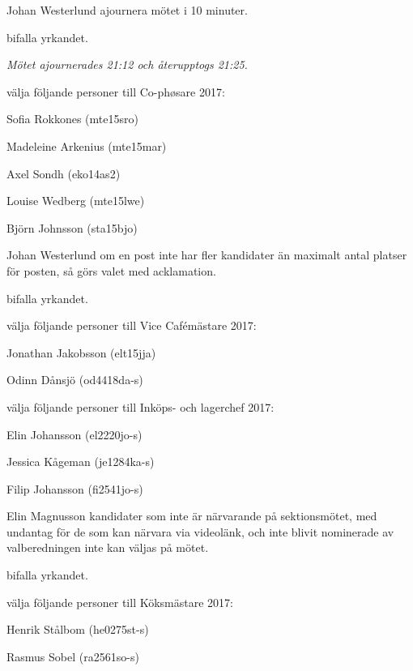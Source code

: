 \documentclass[10pt]{article}
\begin{document}
\begin{paragrafer}
\begin{paralist}
    Johan Westerlund \ypa ajournera mötet i 10 minuter.

    \Mba bifalla yrkandet.

    \emph{Mötet ajournerades 21:12 och återupptogs 21:25.}


    \Mba välja följande personer till Co-phøsare 2017:
    \begin{tightdashlist}
        \item Sofia Rokkones (mte15sro)
        \item Madeleine Arkenius (mte15mar)
        \item Axel Sondh (eko14as2)
        \item Louise Wedberg (mte15lwe)
        \item Björn Johnsson (sta15bjo)
    \end{tightdashlist}

    Johan Westerlund \ypa om en post inte har fler kandidater än maximalt antal platser för posten, så görs valet med acklamation.

    \Mba bifalla yrkandet.

    \Mba välja följande personer till Vice Cafémästare 2017:
    \begin{tightdashlist}
        \item Jonathan Jakobsson (elt15jja)
        \item Odinn Dånsjö (od4418da-s)
    \end{tightdashlist}

    \Mba välja följande personer till Inköps- och lagerchef 2017:
    \begin{tightdashlist}
        \item Elin Johansson (el2220jo-s)
        \item Jessica Kågeman (je1284ka-s)
        \item Filip Johansson (fi2541jo-s)
    \end{tightdashlist}

    Elin Magnusson \ypa kandidater som inte är närvarande på sektionsmötet, med undantag för de som kan närvara via videolänk, och inte blivit nominerade av valberedningen inte kan väljas på mötet.

    \Mba bifalla yrkandet.

    \Mba välja följande personer till Köksmästare 2017:
    \begin{tightdashlist}
        \item Henrik Stålbom (he0275st-s)
        \item Rasmus Sobel (ra2561so-s)
    \end{tightdashlist}


\end{paralist}
\end{paragrafer}
\end{document}
